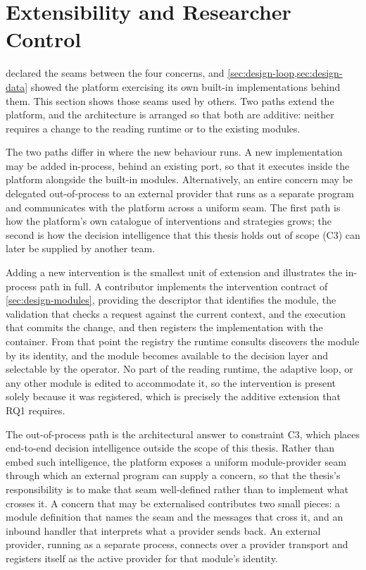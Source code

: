 \section{Extensibility and Researcher Control}
\label{sec:design-extensibility}
 declared the seams between the four concerns, and \cref{sec:design-loop,sec:design-data} showed the platform exercising its own built-in implementations behind them.
This section shows those seams used by others.
Two paths extend the platform, and the architecture is arranged so that both are additive: neither requires a change to the reading runtime or to the existing modules.

The two paths differ in where the new behaviour runs.
A new implementation may be added in-process, behind an existing port, so that it executes inside the platform alongside the built-in modules.
Alternatively, an entire concern may be delegated out-of-process to an external provider that runs as a separate program and communicates with the platform across a uniform seam.
The first path is how the platform's own catalogue of interventions and strategies grows; the second is how the decision intelligence that this thesis holds out of scope (C3) can later be supplied by another team.

Adding a new intervention is the smallest unit of extension and illustrates the in-process path in full.
A contributor implements the intervention contract of \cref{sec:design-modules}, providing the descriptor that identifies the module, the validation that checks a request against the current context, and the execution that commits the change, and then registers the implementation with the container.
From that point the registry the runtime consults discovers the module by its identity, and the module becomes available to the decision layer and selectable by the operator.
No part of the reading runtime, the adaptive loop, or any other module is edited to accommodate it, so the intervention is present solely because it was registered, which is precisely the additive extension that RQ1 requires.

The out-of-process path is the architectural answer to constraint C3, which places end-to-end decision intelligence outside the scope of this thesis.
Rather than embed such intelligence, the platform exposes a uniform module-provider seam through which an external program can supply a concern, so that the thesis's responsibility is to make that seam well-defined rather than to implement what crosses it.
A concern that may be externalised contributes two small pieces: a module definition that names the seam and the messages that cross it, and an inbound handler that interprets what a provider sends back.
An external provider, running as a separate process, connects over a provider transport and registers itself as the active provider for that module's identity.

